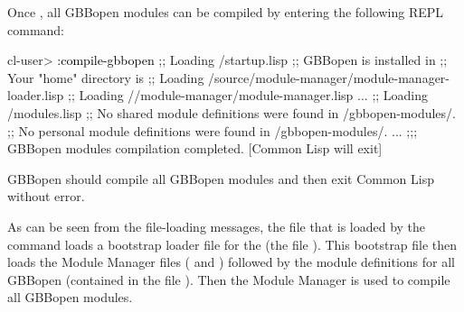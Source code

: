 \documentclass[10pt,twoside,english,pdftex]{article}
\begin{document}
%
%
%
Once , all GBBopen
modules can be compiled by entering the following REPL command:
%
\W\supp\notpretop
\begin{smallexample}
\textcolor{darkergray}{%
  cl-user> \textcolor{black}{:compile-gbbopen}
  ;; Loading /startup.lisp
  ;; GBBopen is installed in 
  ;; Your "home" directory is 
  ;;  Loading /source/module-manager/module-manager-loader.lisp
  ;; Loading //module-manager/module-manager.lisp
       ...
  ;; Loading /modules.lisp
  ;; No shared module definitions were found in /gbbopen-modules/.
  ;; No personal module definitions were found in /gbbopen-modules/.
       ...
  ;;; GBBopen modules compilation completed.
  \textrm{[Common Lisp will exit]}}
\end{smallexample}
%
GBBopen should compile all GBBopen modules and then exit Common Lisp without
error.

As can be seen from the file-loading messages, the 
file that is loaded by the  command loads a bootstrap
loader file for the  (the
file ).  This
bootstrap file then loads the Module Manager files
( and
) followed by the
module definitions for all GBBopen  (contained in the file
).  Then the Module Manager is used to
compile all GBBopen modules.
\end{document}
